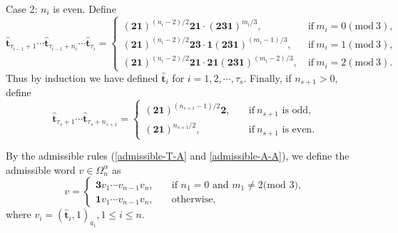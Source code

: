 \documentclass[reqno,11pt,graphicx,]{amsart}
\numberwithin{equation}{section}
\theoremstyle{plain}
\newcommand{\3}{\mathbf{3}}
\begin{document}
	{\rm Case 2:} $n_i$ is even. Define
	\begin{equation*}\label{type-2}
		\hat{\mathbf{t}}_{\tau_{i-1}+1}\cdots \hat{\mathbf{t}}_{\tau_{i-1}+n_i}\cdots \hat{\mathbf{t}}_{\tau_i}=\begin{cases}
			(\mathbf{2}\mathbf{1})^{(n_i-2)/2}\mathbf{2}\mathbf{1}\cdot(\mathbf{2}\mathbf{3}\mathbf{1})^{m_i/3},\ &\text{if}\ m_i=0(\text{mod}\ 3),\\
			(\mathbf{2}\mathbf{1})^{(n_i-2)/2}\mathbf{2}\mathbf{3}\cdot\mathbf{1}(\mathbf{2}\mathbf{3}\mathbf{1})^{(m_i-1)/3},\ &\text{if}\ m_i=1(\text{mod}\ 3),\\
			(\mathbf{2}\mathbf{1})^{(n_i-2)/2}\mathbf{2}\mathbf{1}\cdot\mathbf{2}\mathbf{1}(\mathbf{2}\mathbf{3}\mathbf{1})^{(m_i-2)/3},\ &\text{if}\ m_i=2(\text{mod}\ 3).
		\end{cases}
	\end{equation*}
	Thus by induction we have defined $\hat{\mathbf{t}}_i$ for $i=1,2,\cdots,\tau_s$. Finally, if $n_{s+1}>0$, define 
	\begin{equation*}
		\hat{\mathbf{t}}_{\tau_s+1}\cdots\hat{\mathbf{t}}_{\tau_s+n_{s+1}}=\begin{cases}
			(\mathbf{2}\mathbf{1})^{(n_{s+1}-1)/2}\mathbf{2},\quad &\text{if}\ n_{s+1}\text{ is odd},\\
			(\mathbf{2}\mathbf{1})^{n_{s+1}/2},\quad &\text{if}\ n_{s+1}\text{ is even}.
		\end{cases}
	\end{equation*}
	
	By the admissible rules (\eqref{admissible-T-A} and \eqref{admissible-A-A}), we define the admissible word $v\in\Omega^{\alpha}_{n}$ as
	\begin{equation*}
		v=\begin{cases}
			\mathbf{3}v_1\cdots v_{n-1}v_{n},\quad&\text{if $n_1=0$ and $m_1 \neq 2$(mod 3)},\\
			\mathbf{1}v_1\cdots v_{n-1}v_{n},\quad&\text{otherwise},
		\end{cases}
	\end{equation*} 
	where $v_i=(\hat{\mathbf{t}}_i,1)_{a_i}, 1\leq i\leq n$. 
	
\end{document}
